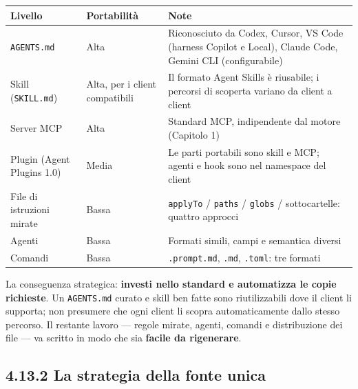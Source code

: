 \documentclass[
  italian,
  10pt,
]{book}
\newcounter{none} %
\begin{document}
{\def\LTcaptype{none} %
\begin{longtable}[]{@{}
  >{\raggedright\arraybackslash}p{}
  >{\raggedright\arraybackslash}p{}
  >{\raggedright\arraybackslash}p{}@{}}
\toprule\noalign{}
\begin{minipage}[b]{\linewidth}\raggedright
Livello
\end{minipage} & \begin{minipage}[b]{\linewidth}\raggedright
Portabilità
\end{minipage} & \begin{minipage}[b]{\linewidth}\raggedright
Note
\end{minipage} \\
\midrule\noalign{}
\endhead
\bottomrule\noalign{}
\endlastfoot
\texttt{AGENTS.md} & Alta & Riconosciuto da Codex, Cursor, VS Code
(harness Copilot e Local), Claude Code, Gemini CLI (configurabile) \\
Skill (\texttt{SKILL.md}) & Alta, per i client compatibili & Il formato
Agent Skills è riusabile; i percorsi di scoperta variano da client a
client \\
Server MCP & Alta & Standard MCP, indipendente dal motore (Capitolo
1) \\
Plugin (Agent Plugins 1.0) & Media & Le parti portabili sono skill e
MCP; agenti e hook sono nel namespace del client \\
File di istruzioni mirate & Bassa & \texttt{applyTo} / \texttt{paths} /
\texttt{globs} / sottocartelle: quattro approcci \\
Agenti & Bassa & Formati simili, campi e semantica diversi \\
Comandi & Bassa & \texttt{.prompt.md}, \texttt{.md}, \texttt{.toml}: tre
formati \\
\end{longtable}
}

La conseguenza strategica: \textbf{investi nello standard e automatizza
le copie richieste}. Un \texttt{AGENTS.md} curato e skill ben fatte sono
riutilizzabili dove il client li supporta; non presumere che ogni client
li scopra automaticamente dallo stesso percorso. Il restante lavoro ---
regole mirate, agenti, comandi e distribuzione dei file --- va scritto
in modo che sia \textbf{facile da rigenerare}.

\subsection{4.13.2 La strategia della fonte
unica}\label{la-strategia-della-fonte-unica}
\end{document}
